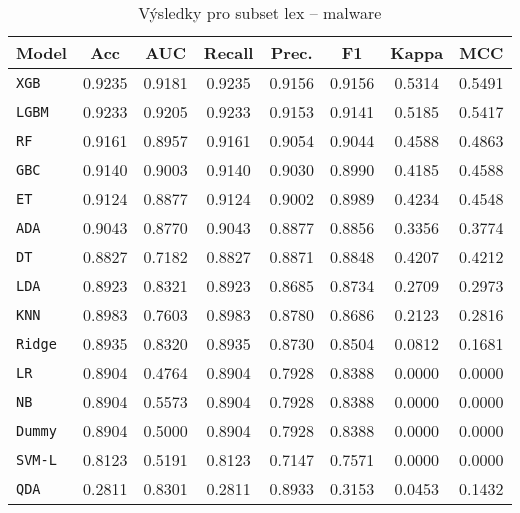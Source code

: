 \begin{table}[H]
  \centering
  \small
  \caption{Výsledky pro subset lex – malware}
  \begin{tabular}{|l|c|c|c|c|c|c|c|}
    \hline
    \textbf{Model} & \textbf{Acc} & \textbf{AUC} & \textbf{Recall} & \textbf{Prec.} & \textbf{F1} & \textbf{Kappa} & \textbf{MCC} \\
    \hline
    \texttt{XGB} & 0.9235 & 0.9181 & 0.9235 & 0.9156 & 0.9156 & 0.5314 & 0.5491 \\
    \texttt{LGBM} & 0.9233 & 0.9205 & 0.9233 & 0.9153 & 0.9141 & 0.5185 & 0.5417 \\
    \texttt{RF} & 0.9161 & 0.8957 & 0.9161 & 0.9054 & 0.9044 & 0.4588 & 0.4863 \\
    \texttt{GBC} & 0.9140 & 0.9003 & 0.9140 & 0.9030 & 0.8990 & 0.4185 & 0.4588 \\
    \texttt{ET} & 0.9124 & 0.8877 & 0.9124 & 0.9002 & 0.8989 & 0.4234 & 0.4548 \\
    \texttt{ADA} & 0.9043 & 0.8770 & 0.9043 & 0.8877 & 0.8856 & 0.3356 & 0.3774 \\
    \texttt{DT} & 0.8827 & 0.7182 & 0.8827 & 0.8871 & 0.8848 & 0.4207 & 0.4212 \\
    \texttt{LDA} & 0.8923 & 0.8321 & 0.8923 & 0.8685 & 0.8734 & 0.2709 & 0.2973 \\
    \texttt{KNN} & 0.8983 & 0.7603 & 0.8983 & 0.8780 & 0.8686 & 0.2123 & 0.2816 \\
    \texttt{Ridge} & 0.8935 & 0.8320 & 0.8935 & 0.8730 & 0.8504 & 0.0812 & 0.1681 \\
    \texttt{LR} & 0.8904 & 0.4764 & 0.8904 & 0.7928 & 0.8388 & 0.0000 & 0.0000 \\
    \texttt{NB} & 0.8904 & 0.5573 & 0.8904 & 0.7928 & 0.8388 & 0.0000 & 0.0000 \\
    \texttt{Dummy} & 0.8904 & 0.5000 & 0.8904 & 0.7928 & 0.8388 & 0.0000 & 0.0000 \\
    \texttt{SVM-L} & 0.8123 & 0.5191 & 0.8123 & 0.7147 & 0.7571 & 0.0000 & 0.0000 \\
    \texttt{QDA} & 0.2811 & 0.8301 & 0.2811 & 0.8933 & 0.3153 & 0.0453 & 0.1432 \\
    \hline
  \end{tabular}
\end{table}
\vspace{0.5cm}


